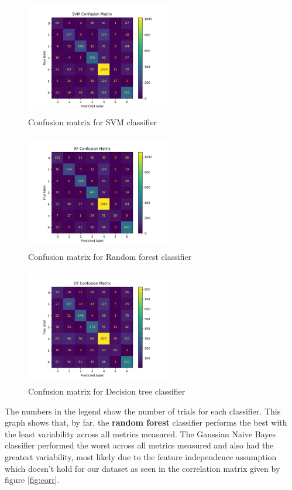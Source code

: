 \documentclass[journal,twocolumn,12pt,twoside]{IEEEtran}
\begin{document}
\begin{figure}
    \includegraphics[width=2.5in,height=2in]{images/SVM_Confusion_Matrix.png}
    \captionsetup{font=scriptsize}
    \caption{Confusion matrix for SVM classifier}
    \label{fig:SVM_CM}
\end{figure}

\begin{figure}
    \includegraphics[width=2.5in,height=2in]{images/RF_Confusion_Matrix.png}
    \captionsetup{font=scriptsize}
    \caption{Confusion matrix for Random forest classifier}
    \label{fig:RF_CM}
\end{figure}

\begin{figure}
    \includegraphics[width=2.5in,height=2in]{images/DT_Confusion_Matrix.png}
    \captionsetup{font=scriptsize}
    \caption{Confusion matrix for Decision tree classifier}
    \label{fig:DT_CM}
\end{figure}

The numbers in the legend show the number of trials for each classifier. This graph shows that, by far, the \textbf{random forest} classifier performs the best with the least variability across all metrics measured. The Gaussian Naive Bayes classifier performed the worst across all metrics measured and also had the greatest variability, most likely due to the feature independence assumption which doesn't hold for our dataset as seen in the correlation matrix given by figure \ref{fig:corr}.
\end{document}
